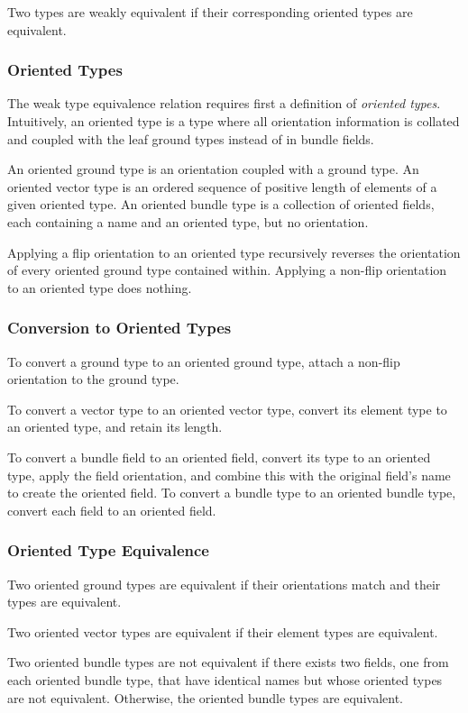 \documentclass[12pt]{article}
\begin{document}
Two types are weakly equivalent if their corresponding oriented types are equivalent.

\subsubsection{Oriented Types}
The weak type equivalence relation requires first a definition of {\em oriented types}. Intuitively, an oriented type is a type where all orientation information is collated and coupled with the leaf ground types instead of in bundle fields.

An oriented ground type is an orientation coupled with a ground type. An oriented vector type is an ordered sequence of positive length of elements of a given oriented type. An oriented bundle type is a collection of oriented fields, each containing a name and an oriented type, but no orientation.

Applying a flip orientation to an oriented type recursively reverses the orientation of every oriented ground type contained within. Applying a non-flip orientation to an oriented type does nothing.

\subsubsection{Conversion to Oriented Types}
To convert a ground type to an oriented ground type, attach a non-flip orientation to the ground type. 

To convert a vector type to an oriented vector type, convert its element type to an oriented type, and retain its length. 

To convert a bundle field to an oriented field, convert its type to an oriented type, apply the field orientation, and combine this with the original field's name to create the oriented field. To convert a bundle type to an oriented bundle type, convert each field to an oriented field.

\subsubsection{Oriented Type Equivalence}
Two oriented ground types are equivalent if their orientations match and their types are equivalent.

Two oriented vector types are equivalent if their element types are equivalent.

Two oriented bundle types are not equivalent if there exists two fields, one from each oriented bundle type, that have identical names but whose oriented types are not equivalent. Otherwise, the oriented bundle types are equivalent.
\end{document}
